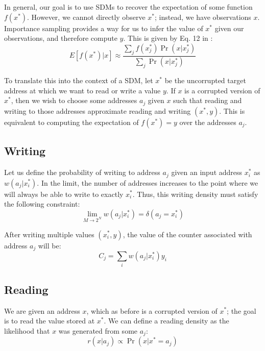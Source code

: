 \documentclass[10pt,letterpaper]{article}
\begin{document}
In general, our goal is to use SDMs to recover the expectation of some
function $f(x^*)$. However, we cannot directly observe $x^*$; instead,
we have observations $x$. Importance sampling provides a way for us to
infer the value of $x^*$ given our observations, and therefore compute
$y$. This is given by Eq. 12 in :
\begin{equation}
E[f(x^*)|x]\approx \frac{\sum_j f(x_j^*)\Pr(x|x_j^*)}{\sum_j \Pr(x|x_j^*)}
\end{equation}

To translate this into the context of a SDM, let $x^*$ be the
uncorrupted target address at which we want to read or write a value
$y$. If $x$ is a corrupted version of $x^*$, then we wish to choose
some addresses $a_j$ given $x$ such that reading and writing to those
addresses approximate reading and writing $(x^*,y)$. This is
equivalent to computing the expectation of $f(x^*)=y$ over the
addresses $a_j$.

\subsection{Writing}

Let us define the probability of writing to address $a_j$ given an
input address $x_i^*$ as $w(a_j|x_i^*)$. In the limit, the number of
addresses increases to the point where we will always be able to write
to exactly $x_i^*$. Thus, this writing density must satisfy the
following constraint:
\begin{equation}
\lim_{M\rightarrow 2^N}w(a_j|x_i^*) = \delta(a_j=x_i^*)
\label{eq:w}
\end{equation}

\noindent After writing multiple values $(x_i^*, y)$, the value of the counter
associated with address $a_j$ will be:
\begin{equation}
C_j=\sum_i w(a_j|x_i^*)y_i
\label{eq:Cj}
\end{equation}

\subsection{Reading}

We are given an address $x$, which as before is a corrupted version of
$x^*$; the goal is to read the value stored at $x^*$. We can define a
reading density as the likelihood that $x$ was generated from some
$a_j$:
\begin{equation}
r(x| a_j)\propto \Pr(x|x^*=a_j)
\label{eq:r}
\end{equation}
\end{document}
